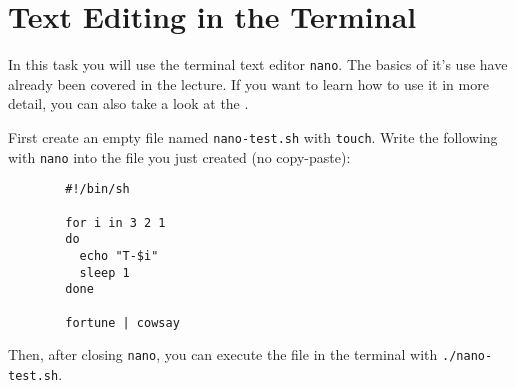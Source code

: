 \documentclass[english]{sheet}
\begin{document}
\section{Text Editing in the Terminal}

\begin{exercise}[subtitle=\texttt{Nano}]
    In this task you will use the terminal text editor \texttt{nano}. The basics of it's use have already been covered in the lecture. If you want to learn how to use it in more detail, you can also take a look at the .

    First create an empty file named \texttt{nano-test.sh} with \texttt{touch}. Write the following with \texttt{nano} into the file you just created (no copy-paste):

    \begin{verbatim}
        #!/bin/sh

        for i in 3 2 1
        do
          echo "T-$i"
          sleep 1
        done

        fortune | cowsay
    \end{verbatim}

    Then, after closing \texttt{nano}, you can execute the file in the terminal with \texttt{./nano-test.sh}.
\end{exercise}
\end{document}
